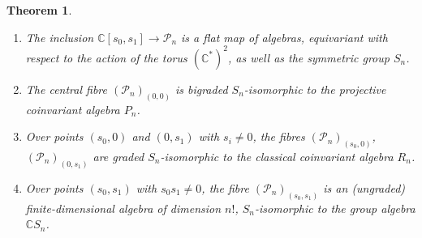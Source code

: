 \documentclass[a4paper,11pt]{amsart}
\theoremstyle{plain}
\newtheorem{theorem}{Theorem}[section]
\theoremstyle{definition}
\newcommand{\C}{\mathbb{C}}
\newcommand{\CP}{\mathscr{P}}
\begin{document}
\begin{theorem}\label{thm_main_def}\begin{enumerate}
\item[(i)] The inclusion $\C[s_0, s_1]\rightarrow \CP_n$ is a flat map of algebras, equivariant with respect to the action of the torus $(\C^*)^2$, as well as the symmetric group $S_n$. 
\item[(ii)] The central fibre $(\CP_n)_{(0,0)}$ is bigraded $S_n$-isomorphic to the projective coinvariant algebra $P_n$. 
\item[(iii)] Over points $(s_0, 0)$ and $(0,s_1)$ with $s_i\neq 0$, the fibres $(\CP_n)_{(s_0,0)}$, $(\CP_n)_{(0,s_1)}$ are graded $S_n$-isomorphic to the classical coinvariant algebra $R_n$.
\item[(iv)] Over points $(s_0, s_1)$ with $s_0s_1\neq 0$, the fibre $(\CP_n)_{(s_0,s_1)}$ is an (ungraded) finite-dimensional algebra of dimension $n!$, $S_n$-isomorphic to the group algebra $\C S_n$. 
\end{enumerate}
\end{theorem}
\end{document}
